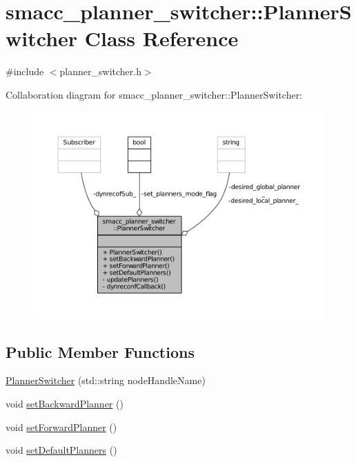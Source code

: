 \hypertarget{classsmacc__planner__switcher_1_1PlannerSwitcher}{}\section{smacc\+\_\+planner\+\_\+switcher\+:\+:Planner\+Switcher Class Reference}
\label{classsmacc__planner__switcher_1_1PlannerSwitcher}


{\ttfamily \#include $<$planner\+\_\+switcher.\+h$>$}



Collaboration diagram for smacc\+\_\+planner\+\_\+switcher\+:\+:Planner\+Switcher\+:
\nopagebreak
\begin{figure}[H]
\begin{center}
\leavevmode
\includegraphics[width=350pt]{classsmacc__planner__switcher_1_1PlannerSwitcher__coll__graph}
\end{center}
\end{figure}
\subsection*{Public Member Functions}
\begin{DoxyCompactItemize}
\item 
\hyperlink{classsmacc__planner__switcher_1_1PlannerSwitcher_aa6172404d533664bdf3b31504d87584f}{Planner\+Switcher} (std\+::string node\+Handle\+Name)
\item 
void \hyperlink{classsmacc__planner__switcher_1_1PlannerSwitcher_a848558a4309a42c546ab87e65722da2f}{set\+Backward\+Planner} ()
\item 
void \hyperlink{classsmacc__planner__switcher_1_1PlannerSwitcher_a6510ee1f23243ee725c61e590354d3bc}{set\+Forward\+Planner} ()
\item 
void \hyperlink{classsmacc__planner__switcher_1_1PlannerSwitcher_a9672bbbb245b3a5120b365810c9cc746}{set\+Default\+Planners} ()
\end{DoxyCompactItemize}
